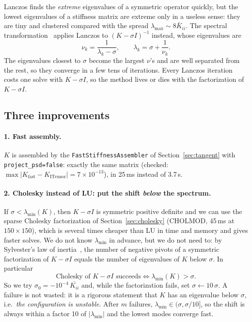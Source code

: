 \documentclass[11pt,a4paper]{article}
\theoremstyle{remark}
\newcommand{\code}[1]{\texttt{#1}}
\begin{document}
Lanczos finds the \emph{extreme} eigenvalues of a symmetric operator quickly, but the lowest
eigenvalues of a stiffness matrix are extreme only in a useless sense: they are tiny and
clustered compared with the spread $\lambda_{\max}\sim8\bar K_{ii}$. The spectral
transformation~\cite{ericsson1980} applies Lanczos to $(K-\sigma I)^{-1}$ instead, whose
eigenvalues are
\begin{equation}
\nu_k = \frac{1}{\lambda_k-\sigma},\qquad \lambda_k = \sigma + \frac1{\nu_k}.
\end{equation}
The eigenvalues closest to $\sigma$ become the largest $\nu$'s and are well separated from the
rest, so they converge in a few tens of iterations. Every Lanczos iteration costs one solve with
$K-\sigma I$, so the method lives or dies with the factorization of $K-\sigma I$.

\subsection{Three improvements}

\paragraph{1. Fast assembly.} $K$ is assembled by the \code{FastStiffnessAssembler} of
Section~\ref{sec:tangent} with \code{project\_\allowbreak{}psd=false}: exactly the same matrix (checked:
$\max|K_{\text{fast}}-K_{\text{ITensor}}|=7\times10^{-13}$), in 25\,ms instead of 3.7\,s.

\paragraph{2. Cholesky instead of LU: put the shift \emph{below} the spectrum.} If
$\sigma<\lambda_{\min}(K)$, then $K-\sigma I$ is symmetric positive definite and we can use the
sparse Cholesky factorization of Section~\ref{sec:cholesky} (CHOLMOD, 45\,ms at $150\times150$), which is several
times cheaper than LU in time and memory and gives faster solves. We do not know
$\lambda_{\min}$ in advance, but we do not need to: by Sylvester's law of
inertia~\cite{grimes1994}, the number of negative pivots of a symmetric factorization of
$K-\sigma I$ equals the number of eigenvalues of $K$ below $\sigma$. In particular
\begin{equation}
\text{Cholesky of }K-\sigma I\text{ succeeds}\iff \lambda_{\min}(K)>\sigma .
\end{equation}
So we try $\sigma_0=-10^{-4}\,\overline{K_{ii}}$ and, while the factorization fails, set
$\sigma\leftarrow10\,\sigma$. A failure is not wasted: it is a rigorous statement that $K$ has an
eigenvalue below $\sigma$, i.e.\ \emph{the configuration is unstable}. After $m$ failures,
$\lambda_{\min}\in(\sigma,\sigma/10]$, so the shift is always within a factor 10 of
$|\lambda_{\min}|$ and the lowest modes converge fast.
\end{document}
